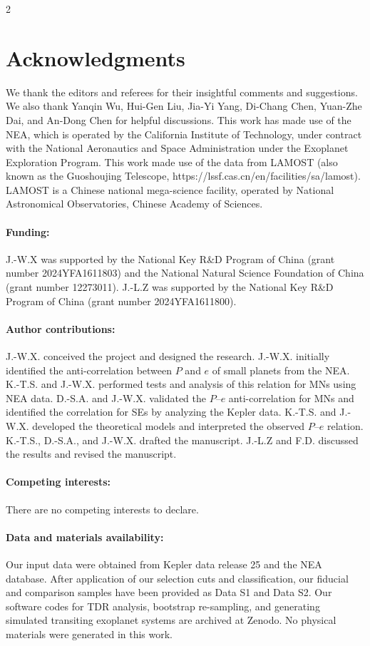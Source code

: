 \documentclass[10pt]{article}
\begin{document}
\begin{multicols}{2}
\section*{Acknowledgments}
\noindent We thank the editors and referees for their insightful comments and suggestions.
We also thank Yanqin Wu, Hui-Gen Liu, Jia-Yi Yang, Di-Chang Chen, Yuan-Zhe Dai, and An-Dong Chen for helpful discussions.
This work has made use of the NEA, which is operated by the California Institute of Technology, under contract with the National Aeronautics and Space Administration under the Exoplanet Exploration Program.
This work made use of the data from LAMOST (also known as the Guoshoujing Telescope, https://lssf.cas.cn/en/facilities/sa/lamost).
LAMOST is a Chinese national mega-science facility, operated by National Astronomical Observatories, Chinese Academy of Sciences.
\paragraph*{Funding:}
J.-W.X  was supported by the National Key R\&D Program of China (grant number 2024YFA1611803) and the National Natural Science Foundation of China (grant number 12273011).
J.-L.Z was supported by the National Key R\&D Program of China (grant number 2024YFA1611800).
\paragraph*{Author contributions:}
J.-W.X. conceived the project and designed the research.
J.-W.X. initially identified the anti-correlation between $P$ and $e$ of small planets from the NEA.
K.-T.S. and J.-W.X. performed tests and analysis of this relation for MNs using NEA data.
D.-S.A. and J.-W.X. validated the $P$--$e$ anti-correlation for MNs and identified the correlation for SEs by analyzing the Kepler data.
K.-T.S. and J.-W.X. developed the theoretical models and interpreted the observed $P$--$e$ relation.
K.-T.S., D.-S.A., and J.-W.X. drafted the manuscript.
J.-L.Z and F.D. discussed the results and revised the manuscript.
\paragraph*{Competing interests:}
There are no competing interests to declare.
\paragraph*{Data and materials availability:}
Our input data were obtained from Kepler data release 25\cite{KDR25} and the NEA database\cite{NEA2024}.
After application of our selection cuts and classification, our fiducial and comparison samples have been provided as Data S1 and Data S2\cite{zenodo}.
Our software codes for TDR analysis, bootstrap re-sampling, and generating simulated transiting exoplanet systems are archived at Zenodo\cite{zenodo}.
No physical materials were generated in this work.







\end{multicols}
\end{document}
